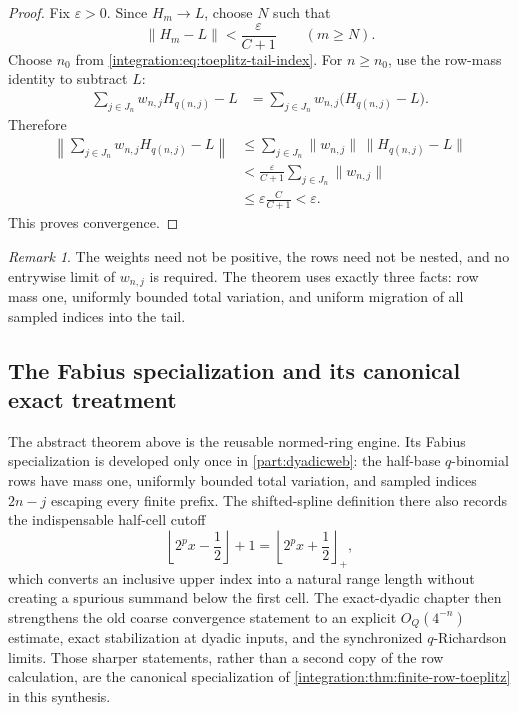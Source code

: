 \documentclass[11pt,oneside]{article}
\theoremstyle{definition}
\theoremstyle{remark}
\newtheorem{remark}[remark]{Remark}
\begin{document}
\begin{proof}
Fix $\varepsilon>0$.  Since $H_m\to L$, choose $N$ such that
\begin{equation}
 \|H_m-L\|<\frac{\varepsilon}{C+1}
 \qquad(m\ge N).
 \label{integration:eq:toeplitz-tail-error}
\end{equation}
Choose $n_0$ from \eqref{integration:eq:toeplitz-tail-index}.  For $n\ge n_0$, use the row-mass identity
to subtract $L$:
\begin{align*}
 \sum_{j\in J_n}w_{n,j}H_{q(n,j)}-L
 &=\sum_{j\in J_n}w_{n,j}\bigl(H_{q(n,j)}-L\bigr).
\end{align*}
Therefore
\begin{align*}
 \left\|\sum_{j\in J_n}w_{n,j}H_{q(n,j)}-L\right\|
 &\le\sum_{j\in J_n}\|w_{n,j}\|\,\|H_{q(n,j)}-L\|\\
 &<\frac{\varepsilon}{C+1}\sum_{j\in J_n}\|w_{n,j}\|\\
 &\le\varepsilon\frac{C}{C+1}<\varepsilon.
\end{align*}
This proves convergence.
\end{proof}

\begin{remark}
The weights need not be positive, the rows need not be nested, and no entrywise limit of
$w_{n,j}$ is required.  The theorem uses exactly three facts: row mass one, uniformly bounded
total variation, and uniform migration of all sampled indices into the tail.
\end{remark}

\subsection{The Fabius specialization and its canonical exact treatment}
\label{integration:sec:fabius-toeplitz}
The abstract theorem above is the reusable normed-ring engine.  Its Fabius specialization
is developed only once in \cref{part:dyadicweb}: the half-base \(q\)-binomial rows have
mass one, uniformly bounded total variation, and sampled indices \(2n-j\) escaping every
finite prefix.  The shifted-spline definition there also records the indispensable
half-cell cutoff
\[
 \left\lfloor 2^p x-\frac12\right\rfloor+1
 =\left\lfloor 2^p x+\frac12\right\rfloor_{+},
\]
which converts an inclusive upper index into a natural range length without creating a
spurious summand below the first cell.  The exact-dyadic chapter then strengthens the old
coarse convergence statement to an explicit \(O_Q(4^{-n})\) estimate, exact stabilization
at dyadic inputs, and the synchronized \(q\)-Richardson limits.  Those sharper statements,
rather than a second copy of the row calculation, are the canonical specialization of
\cref{integration:thm:finite-row-toeplitz} in this synthesis.
\end{document}
